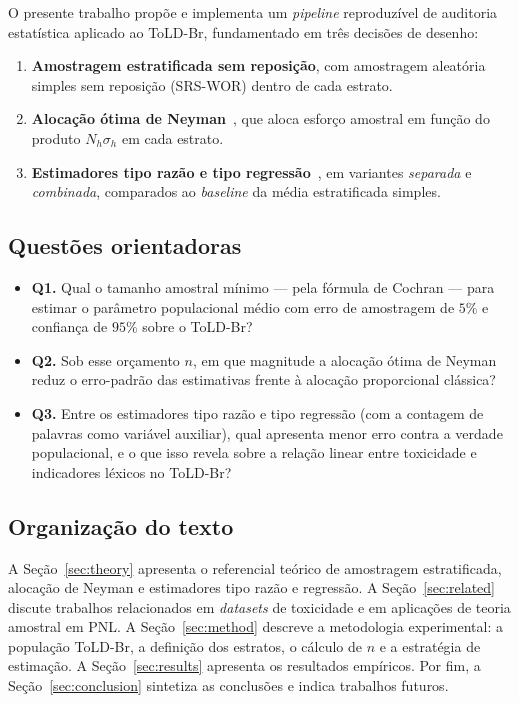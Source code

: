 O presente trabalho propõe e implementa um \textit{pipeline} reproduzível de
auditoria estatística aplicado ao ToLD-Br, fundamentado em três decisões de
desenho:
\begin{enumerate}
  \item \textbf{Amostragem estratificada sem reposição}, com amostragem
        aleatória simples sem reposição (SRS-WOR) dentro de cada estrato.
  \item \textbf{Alocação ótima de Neyman}~\cite{cochran1977,bolfarine2005},
        que aloca esforço amostral em função do produto $N_h \sigma_h$ em cada
        estrato.
  \item \textbf{Estimadores tipo razão e tipo regressão}~\cite{cochran1977},
        em variantes \textit{separada} e \textit{combinada}, comparados ao
        \textit{baseline} da média estratificada simples.
\end{enumerate}

\subsection*{Questões orientadoras}

\begin{itemize}
  \item \textbf{Q1.} Qual o tamanho amostral mínimo --- pela fórmula de
        Cochran --- para estimar o parâmetro populacional médio com erro de
        amostragem de $5\%$ e confiança de $95\%$ sobre o ToLD-Br?
  \item \textbf{Q2.} Sob esse orçamento $n$, em que magnitude a alocação ótima
        de Neyman reduz o erro-padrão das estimativas frente à alocação
        proporcional clássica?
  \item \textbf{Q3.} Entre os estimadores tipo razão e tipo regressão (com a
        contagem de palavras como variável auxiliar), qual apresenta menor
        erro contra a verdade populacional, e o que isso revela sobre a
        relação linear entre toxicidade e indicadores léxicos no ToLD-Br?
\end{itemize}

\subsection*{Organização do texto}

A Seção~\ref{sec:theory} apresenta o referencial teórico de amostragem
estratificada, alocação de Neyman e estimadores tipo razão e regressão. A
Seção~\ref{sec:related} discute trabalhos relacionados em \textit{datasets} de
toxicidade e em aplicações de teoria amostral em PNL. A
Seção~\ref{sec:method} descreve a metodologia experimental: a população
ToLD-Br, a definição dos estratos, o cálculo de $n$ e a estratégia de
estimação. A Seção~\ref{sec:results} apresenta os resultados
empíricos. Por fim, a Seção~\ref{sec:conclusion} sintetiza as conclusões e
indica trabalhos futuros.
